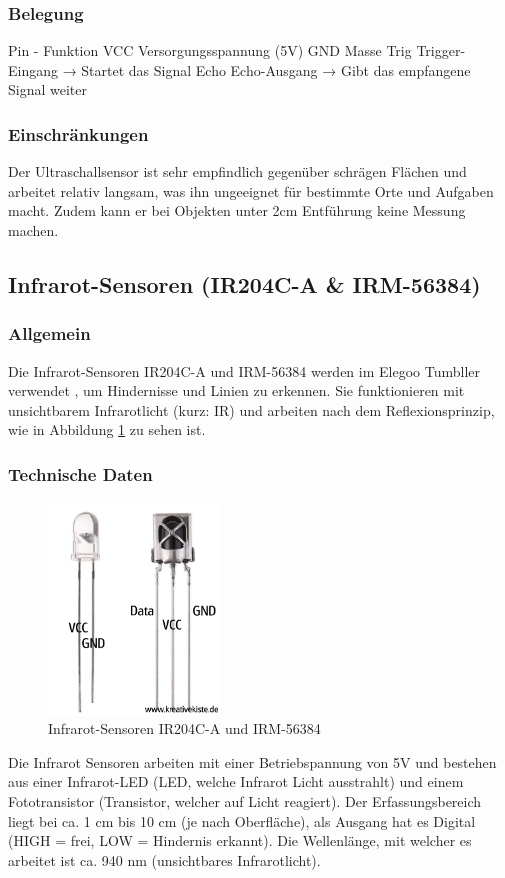 \subsubsection{Belegung}
Pin  -   	Funktion
VCC	Versorgungsspannung (5V)
GND	Masse
Trig	Trigger-Eingang → Startet das Signal
Echo	Echo-Ausgang → Gibt das empfangene Signal weiter
\subsubsection{Einschränkungen}
Der Ultraschallsensor ist sehr empfindlich
gegenüber schrägen Flächen und arbeitet relativ langsam,
was ihn ungeeignet für bestimmte Orte und Aufgaben macht.
%
Zudem kann er bei Objekten unter 2cm Entführung keine Messung machen.
%
\subsection{Infrarot-Sensoren (IR204C-A \& IRM-56384)}
%
\subsubsection{Allgemein}
Die Infrarot-Sensoren IR204C-A und IRM-56384 werden im Elegoo Tumbller verwendet \cite{ir-sensor},
um Hindernisse und Linien zu erkennen.
%
Sie funktionieren mit unsichtbarem Infrarotlicht (kurz: IR)
und arbeiten nach dem Reflexionsprinzip,
wie in Abbildung \ref{fig:infrarot_sensoren} zu sehen ist.
\subsubsection{Technische Daten}
\begin{figure}[H]
    \centering
    \includegraphics[width=0.4\textwidth]{img/Hardware/Infrarot_Sensor.png}
    \caption{Infrarot-Sensoren IR204C-A und IRM-56384}
    \label{fig:infrarot_sensoren}
\end{figure}
Die Infrarot Sensoren arbeiten mit einer Betriebspannung von 5V und bestehen aus einer Infrarot-LED
(LED, welche Infrarot Licht ausstrahlt) und 
einem Fototransistor (Transistor, welcher auf Licht reagiert).
%
Der Erfassungsbereich liegt bei ca. 1 cm bis 10 cm (je nach Oberfläche),
als Ausgang hat es Digital (HIGH = frei, LOW = Hindernis erkannt).
%
Die Wellenlänge, mit welcher es arbeitet ist ca. 940 nm (unsichtbares Infrarotlicht).

